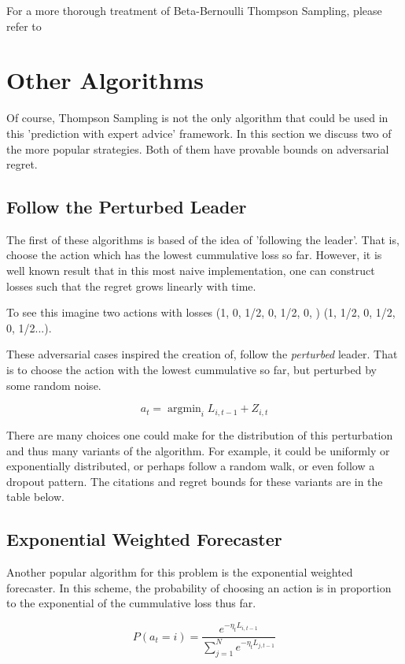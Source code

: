 \documentclass[10pt,a4paper]{article} %
\DeclareMathOperator*{\argmin}{argmin}
\begin{document}
	For a more thorough treatment of Beta-Bernoulli Thompson Sampling, please refer to \cite{}
	
	\section{Other Algorithms}
	
	Of course, Thompson Sampling is not the only algorithm that could be used in this 'prediction with expert advice' framework.  In this section we discuss two of the more popular strategies.  Both of them have provable bounds on adversarial regret.
	
	\subsection{Follow the Perturbed Leader}
	
	The first of these algorithms is based of the idea of 'following the leader'.  That is, choose the action which has the lowest cummulative loss so far.  However, it is well known result that in this most naive implementation, one can construct losses such that the regret grows linearly with time.
	
	To see this imagine two actions with losses (1, 0, 1/2, 0, 1/2, 0, ) (1, 1/2, 0, 1/2, 0, 1/2...).
	
	These adversarial cases inspired the creation of, follow the \textit{perturbed} leader.  That is to choose the action with the lowest cummulative so far, but perturbed by some random noise.
	
	$$a_t = \argmin_i L_{i, t-1} + Z_{i, t}$$
	
	There are many choices one could make for the distribution of this perturbation and thus many variants of the algorithm.  For example, it could be uniformly or exponentially distributed, or perhaps follow a random walk, or even follow a dropout pattern.  The citations and regret bounds for these variants are in the table below.
	
	\subsection{Exponential Weighted Forecaster}
	
	Another popular algorithm for this problem is the exponential weighted forecaster.  In this scheme, the probability of choosing an action is in proportion to the exponential of the cummulative loss thus far. 
	
	$$P(a_t = i) = \frac{e^{-\eta_t L_{i, t - 1}}}{\sum_{j = 1}^N  e^{-\eta_t L_{j, t - 1}}}$$
	
\end{document}
